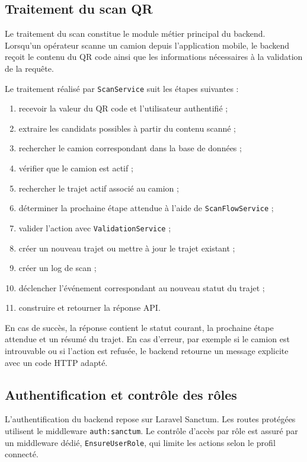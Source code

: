 \subsection*{Traitement du scan QR}

Le traitement du scan constitue le module métier principal du backend. Lorsqu'un opérateur scanne un camion depuis l'application mobile, le backend reçoit le contenu du QR code ainsi que les informations nécessaires à la validation de la requête.

Le traitement réalisé par \texttt{ScanService} suit les étapes suivantes :

\begin{enumerate}
    \item recevoir la valeur du QR code et l'utilisateur authentifié ;
    \item extraire les candidats possibles à partir du contenu scanné ;
    \item rechercher le camion correspondant dans la base de données ;
    \item vérifier que le camion est actif ;
    \item rechercher le trajet actif associé au camion ;
    \item déterminer la prochaine étape attendue à l'aide de \texttt{ScanFlowService} ;
    \item valider l'action avec \texttt{ValidationService} ;
    \item créer un nouveau trajet ou mettre à jour le trajet existant ;
    \item créer un log de scan ;
    \item déclencher l'événement correspondant au nouveau statut du trajet ;
    \item construire et retourner la réponse API.
\end{enumerate}

En cas de succès, la réponse contient le statut courant, la prochaine étape attendue et un résumé du trajet. En cas d'erreur, par exemple si le camion est introuvable ou si l'action est refusée, le backend retourne un message explicite avec un code HTTP adapté.

\subsection*{Authentification et contrôle des rôles}

L'authentification du backend repose sur Laravel Sanctum. Les routes protégées utilisent le middleware \texttt{auth:sanctum}. Le contrôle d'accès par rôle est assuré par un middleware dédié, \texttt{EnsureUserRole}, qui limite les actions selon le profil connecté.

